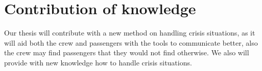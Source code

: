 \chapter{Contribution of knowledge}
\label{ch:contribution}


Our thesis will contribute with a new method on handling crisis situations, as it will aid both the crew and passengers with the tools to communicate better, also the crew may find passengers that they would not find otherwise. We also will provide with new knowledge how to handle crisis situations.
